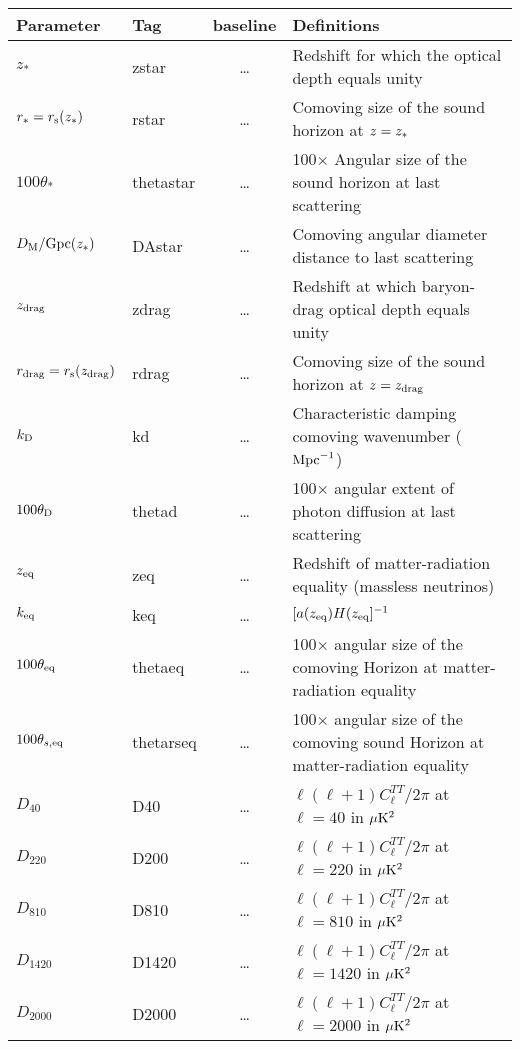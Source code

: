 \newpage
\begin{tabular} {| l | l | c | l |}
\hline
Parameter & Tag & baseline & Definitions \\
\hline
\hline
$z_*                   $ &  zstar       &\dots & Redshift for which the optical depth equals unity\\
$r_*=r_{\rm s}(z_{\rm *}) $ &  rstar    &\dots & Comoving size of the sound horizon at $z = z_{\rm *}$\\
$100\theta_*           $ &  thetastar   &\dots &100$\times$ Angular size of the sound horizon at last scattering\\
$D_{\rm M}/{\rm Gpc}(z_*)   $ & DAstar  &\dots & Comoving angular diameter distance to last scattering \\
$z_{\rm drag}          $ &  zdrag       &\dots &Redshift at which baryon-drag optical depth equals unity\\
$r_{\rm drag}=r_{\rm s}(z_{\rm drag}) $& rdrag &\dots &Comoving size of the sound horizon at $z = z_{\rm drag}$\\
$k_{\rm D}             $ & kd           &\dots &Characteristic damping comoving wavenumber (${\rm Mpc}^{-1}$)\\
$100\theta_{\rm D}     $ & thetad       &\dots &100$\times$ angular extent of photon diffusion at last scattering \\
$z_{\rm eq}            $ & zeq          &\dots &Redshift of matter-radiation equality (massless neutrinos)\\
$k_{\rm eq}            $ & keq          &\dots & $[a(z_{\rm eq}) H(z_{\rm eq}]^{-1}$\\
$100\theta_{\rm eq}    $ & thetaeq  &\dots &100$\times$ angular size of the comoving Horizon at matter-radiation equality\\
$100\theta_{s,\rm eq}  $ & thetarseq  &\dots &100$\times$ angular size of the comoving sound Horizon at matter-radiation equality\\
\hline
$D_{40}     $&  D40    &\dots &$\ell(\ell+1)C_\ell^{TT}/2\pi$ at $\ell=40$ in $\mu {\rm K}^2$\\
$D_{220}    $&  D200    &\dots &$\ell(\ell+1)C_\ell^{TT}/2\pi$ at $\ell=220$ in $\mu {\rm K}^2$\\
$D_{810}    $&  D810    &\dots &$\ell(\ell+1)C_\ell^{TT}/2\pi$ at $\ell=810$ in $\mu {\rm K}^2$\\
$D_{1420}   $&  D1420    &\dots &$\ell(\ell+1)C_\ell^{TT}/2\pi$ at $\ell=1420$ in $\mu {\rm K}^2$\\
$D_{2000}   $&  D2000    &\dots &$\ell(\ell+1)C_\ell^{TT}/2\pi$ at $\ell=2000$ in $\mu {\rm K}^2$\\

\end{tabular}
